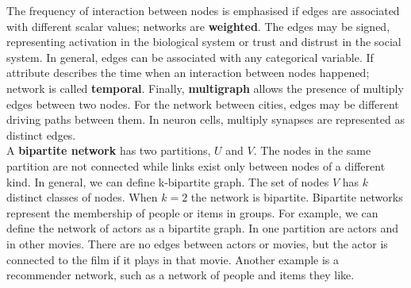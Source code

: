 
The frequency of interaction between nodes is emphasised if edges are associated with different scalar values; networks are \textbf{weighted}. The edges may be signed, representing activation in the biological system or trust and distrust in the social system. In general, edges can be associated with any categorical variable. If attribute describes the time when an interaction between nodes happened; network is called \textbf{temporal}. Finally, \textbf{multigraph} allows the presence of multiply edges between two nodes. For the network between cities, edges may be different driving paths between them. In neuron cells, multiply synapses are represented as distinct edges. \\



A \textbf{bipartite network} has two partitions, $U$ and $V$. The nodes in the same partition are not connected while links exist only between nodes of a different kind. In general, we can define k-bipartite graph. The set of nodes $V$ has $k$ distinct classes of nodes. When $k=2$ the network is bipartite.  Bipartite networks represent the membership of people or items in groups. For example, we can define the network of actors as a bipartite graph. In one partition are actors and in other movies. There are no edges between actors or movies, but the actor is connected to the film if it plays in that movie. Another example is a recommender network, such as a network of people and items they like. 


